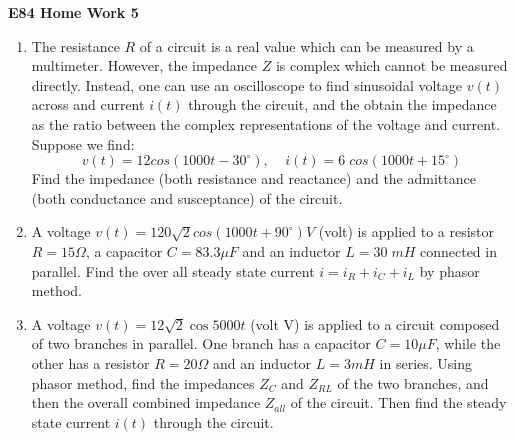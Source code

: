 \usepackage{html}

\begin{center}
{\Large \bf E84 Home Work 5}
\end{center}
\begin{enumerate}

\item The resistance $R$ of a circuit is a real value which can be measured
by a multimeter. However, the impedance $Z$ is complex which cannot be 
measured directly. Instead, one can use an oscilloscope to find sinusoidal 
voltage $v(t)$ across and current $i(t)$ through the circuit, and the obtain
the impedance as the ratio between the complex representations of the voltage
and current. Suppose we find:
\[ v(t)=12 cos(1000t-30^\circ),\;\;\;\; i(t)=6\;cos(1000t+15^\circ) \]
Find the impedance (both resistance and reactance) and the admittance (both
conductance and susceptance) of the circuit.


\item A voltage $v(t)=120\sqrt{2} cos(1000t+90^\circ) V$ (volt) is applied to 
a resistor $R=15\Omega$, a capacitor $C=83.3\mu F$ and an inductor $L=30\; mH$ 
connected in parallel. Find the over all steady state current $i=i_R+i_C+i_L$ 
by phasor method.


\item A voltage $v(t)=12\sqrt{2} \cos 5000 t$ (volt V) is applied to a circuit
composed of two branches in parallel. One branch has a capacitor $C=10\mu F$,
while the other has a resistor $R=20\Omega$ and an inductor $L=3 mH$ in series.
Using phasor method, find the impedances $Z_C$ and $Z_{RL}$ of the two branches,
and then the overall combined impedance $Z_{all}$ of the circuit. Then find
the steady state current $i(t)$ through the circuit.


\end{enumerate}
